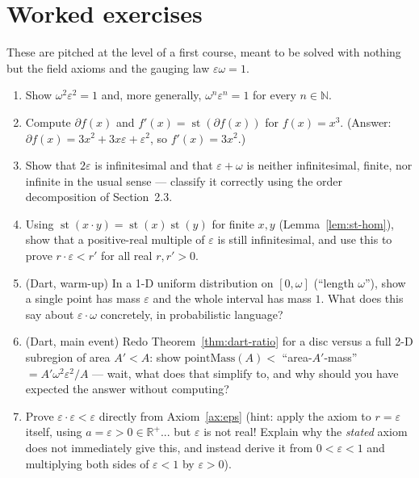 \documentclass[11pt]{article}
\theoremstyle{definition}
\theoremstyle{remark}
\newcommand{\R}{\mathbb{R}}
\newcommand{\N}{\mathbb{N}}
\newcommand{\eps}{\varepsilon}
\newcommand{\st}{\operatorname{st}}
\begin{document}
\section{Worked exercises}

These are pitched at the level of a first course, meant to be solved with
nothing but the field axioms and the gauging law $\eps\omega=1$.

\begin{enumerate}[label=\textbf{Exercise \arabic*.}, leftmargin=2.2cm]
\item Show $\omega^2\eps^2 = 1$ and, more generally, $\omega^n\eps^n=1$ for
every $n\in\N$.
\item Compute $\partial f(x)$ and $f'(x)=\st(\partial f(x))$ for
$f(x)=x^3$. (Answer: $\partial f(x) = 3x^2 + 3x\eps + \eps^2$, so
$f'(x)=3x^2$.)
\item Show that $2\eps$ is infinitesimal and that $\eps+\omega$ is
neither infinitesimal, finite, nor infinite in the usual sense — classify
it correctly using the order decomposition of Section~2.3.
\item Using $\st(x\cdot y) = \st(x)\st(y)$ for finite $x,y$
(Lemma~\ref{lem:st-hom}), show that a positive-real multiple of $\eps$ is
still infinitesimal, and use this to prove $r\cdot\eps < r'$ for all real
$r,r'>0$.
\item (Dart, warm-up) In a 1-D uniform distribution on $[0,\omega]$
(``length $\omega$''), show a single point has mass $\eps$ and the whole
interval has mass $1$. What does this say about $\eps\cdot\omega$
concretely, in probabilistic language?
\item (Dart, main event) Redo Theorem~\ref{thm:dart-ratio} for a disc
versus a full 2-D subregion of area $A' < A$: show
$\text{pointMass}(A) < $ ``area-$A'$-mass'' $= A'\omega^2\eps^2/A$ — wait,
what does that simplify to, and why should you have expected the answer
without computing?
\item Prove $\eps\cdot\eps < \eps$ directly from Axiom~\ref{ax:eps} (hint:
apply the axiom to $r=\eps$ itself, using $a=\eps>0\in\R^+$... but $\eps$
is not real! Explain why the \emph{stated} axiom does not immediately give
this, and instead derive it from $0<\eps<1$ and multiplying both sides of
$\eps<1$ by $\eps>0$).
\end{enumerate}

\end{document}
